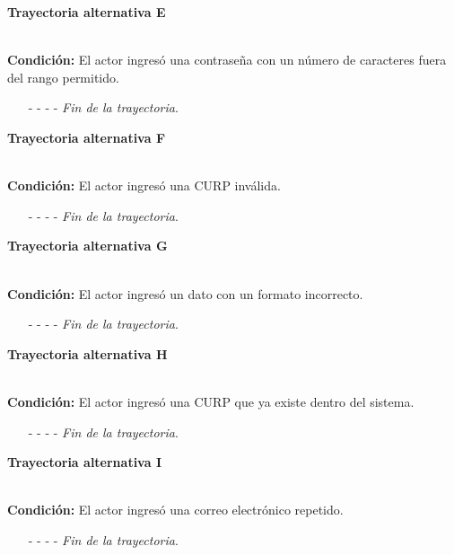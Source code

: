 \hypertarget{CU3-1:TAE}{\textbf{Trayectoria alternativa E}}\\
\noindent \textbf{Condición:} El actor ingresó una contraseña con un número de caracteres fuera del rango permitido.
\begin{enumerate}
	\UCpaso[\UCsist] Muestra el mensaje  señalando el campo que presenta el error en la pantalla .
	\UCpaso Regresa al paso \ref{CU3.1-P3} de la trayectoria principal.
	\item[- -] - - {\em {Fin de la trayectoria}}.%
\end{enumerate}
\hypertarget{CU3-1:TAF}{\textbf{Trayectoria alternativa F}}\\
\noindent \textbf{Condición:} El actor ingresó una CURP inválida.
\begin{enumerate}
	\UCpaso[\UCsist] Muestra el mensaje  señalando el campo que presenta el error en la pantalla .
	\UCpaso Regresa al paso \ref{CU3.1-P3} de la trayectoria principal.
	\item[- -] - - {\em {Fin de la trayectoria}}.
\end{enumerate}
\hypertarget{CU3-1:TAG}{\textbf{Trayectoria alternativa G}}\\
\noindent \textbf{Condición:} El actor ingresó un dato con un formato incorrecto.
\begin{enumerate}
	\UCpaso[\UCsist] Muestra el mensaje  señalando el campo que presenta el error en la pantalla .
	\UCpaso Regresa al paso \ref{CU3.1-P3} de la trayectoria principal.
	\item[- -] - - {\em {Fin de la trayectoria}}.
\end{enumerate}
\hypertarget{CU3-1:TAH}{\textbf{Trayectoria alternativa H}}\\
\noindent \textbf{Condición:} El actor ingresó una CURP que ya existe dentro del sistema.
\begin{enumerate}
	\UCpaso[\UCsist] Muestra el mensaje  señalando el campo que presenta la duplicidad en la pantalla .
	\UCpaso Regresa al paso \ref{CU3.1-P3} de la trayectoria principal.
	\item[- -] - - {\em {Fin de la trayectoria}}.
\end{enumerate}
\hypertarget{CU3-1:TAI}{\textbf{Trayectoria alternativa I}}\\
\noindent \textbf{Condición:} El actor ingresó una correo electrónico repetido.
\begin{enumerate}
	\UCpaso[\UCsist] Muestra el mensaje  señalando el campo que presenta la duplicidad en la pantalla .
	\UCpaso Regresa al paso \ref{CU3.1-P3} de la trayectoria principal.
	\item[- -] - - {\em {Fin de la trayectoria}}.
\end{enumerate}

